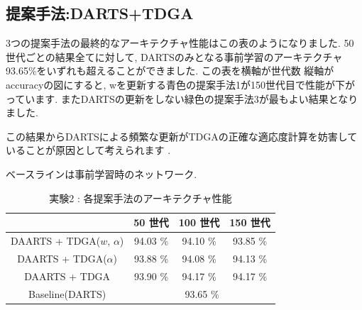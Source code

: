 \clearpage\newpage
\changeindent{0cm}
\subsection{提案手法:DARTS+TDGA}
\label{sec:exp.02}
\changeindent{2cm}

3つの提案手法の最終的なアーキテクチャ性能はこの表のようになりました.
50世代ごとの結果全てに対して, DARTSのみとなる事前学習のアーキテクチャ 93.65\%をいずれも超えることができました.
この表を横軸が世代数 縦軸がaccuracyの図にすると, wを更新する青色の提案手法1が150世代目で性能が下がっています. またDARTSの更新をしない緑色の提案手法3が最もよい結果となりました.

この結果からDARTSによる頻繁な更新がTDGAの正確な適応度計算を妨害していることが原因として考えられます
.



\begin{table}[t]
  \begin{center}
    \caption{実験2 : 各提案手法のアーキテクチャ性能}
		\vspace{-1mm}
    ベースラインは事前学習時のネットワーク.
		\vspace{1mm}
		\vspace{3mm}
    \begin{tabular}{|c|c|c|c|} \hline
    \textbf{}       & \textbf{50 世代} & \textbf{100 世代} & \textbf{150 世代} \\ \hline\hline
    DAARTS + TDGA($w$, $\alpha$)& 94.03 \%       & 94.10 \%        & 93.85 \%        \\ \hline
    DAARTS + TDGA($\alpha$)& 93.88 \%       & 94.08 \%        & 94.13 \%        \\ \hline
    DAARTS + TDGA   & 93.90 \%       & 94.17 \%        & 94.17 \%        \\ \hline
    Baseline(DARTS) & \multicolumn{3}{c|}{93.65 \%}                      \\ \hline
    \end{tabular}
    \label{tab:acc_ga}
  \end{center}
\end{table}

